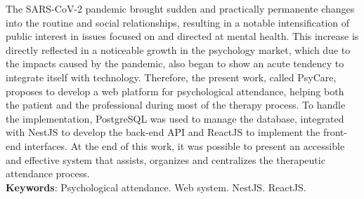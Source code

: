 \begin{resumo}[ABSTRACT]
\begin{SingleSpacing}

The SARS-CoV-2 pandemic brought sudden and practically permanente changes into the routine and social relationships, resulting in a notable intensification of public interest in issues focused on and directed at mental health. This increase is directly reflected in a noticeable growth in the psychology market, which due to the impacts caused by the pandemic, also began to show an acute tendency to integrate itself with technology. Therefore, the present work, called PsyCare, proposes to develop a web platform for psychological attendance, helping both the patient and the professional during most of the therapy process. To handle the implementation, PostgreSQL was used to manage the database, integrated with NestJS to develop the back-end API and ReactJS to implement the front-end interfaces. At the end of this work, it was possible to present an accessible and effective system that assists, organizes and centralizes the therapeutic attendance process. \\

\textbf{Keywords}: Psychological attendance. Web system. NestJS. ReactJS.

\end{SingleSpacing}
\end{resumo}


